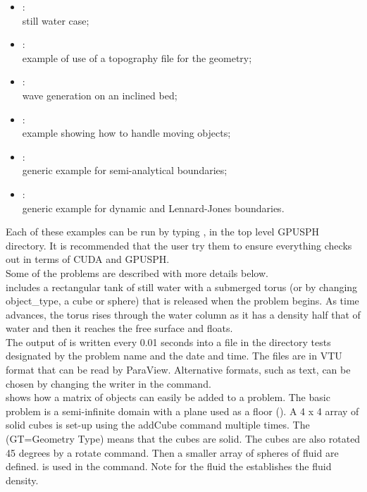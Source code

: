 \documentclass{../GPUSPHtemplate}
\begin{document}
\begin{itemize}
\item	{}:\\
still water case;
\item	{}:\\
example of use of a topography file for the geometry;
\item	{}:\\
wave generation on an inclined bed;
\item	{}:\\
example showing how to handle moving objects;
\item	{}:\\
generic example for semi-analytical boundaries;
\item	{}:\\
generic example for dynamic and Lennard-Jones boundaries.
\end{itemize}

Each of these examples can be run by typing , 
in the top level GPUSPH directory.  
It is recommended that the user try them to ensure 
everything checks out in terms of CUDA and GPUSPH. \\

Some of the problems are described with more details below.\\

 includes a rectangular tank of still water with a submerged torus 
(or by changing object_type, a cube or sphere) that is released when the problem begins.  
As time advances, the torus rises through the water column as it has a 
density half that of water and then it reaches the free surface and floats.  \\
The output of  is written every 0.01 seconds into a file 
in the directory tests designated by the problem name and the date and time.  
The files are in VTU format that can be read by ParaView.  
Alternative formats, such as text, can be chosen by changing the writer in the  command. \\

 shows how a matrix of objects can easily be added to a problem.  
The basic problem is a semi-infinite domain with a plane used as a floor ().  
A 4 x 4 array of solid cubes is set-up using the addCube command multiple times.   
The   (GT=Geometry Type) means that the cubes are solid. 
The cubes are also rotated 45 degrees by a rotate command. 
Then a smaller array of spheres of fluid are defined.  
 is used in the  command.  
Note for the fluid the  establishes the fluid density.  \\
\end{document}
